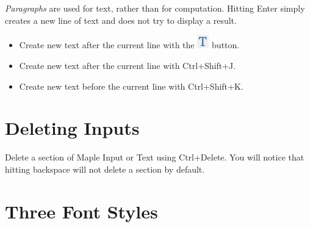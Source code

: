 \textit{Paragraphs} are used for text, rather than for computation. Hitting Enter simply creates a new line of text and does not try to display a result.
\begin{itemize}
\item Create new text after the current line with the \includegraphics[width=0.04\textwidth]{tutorials/figures/new_text.PNG} button.
\item Create new text after the current line with Ctrl+Shift+J.
\item Create new text before the current line with Ctrl+Shift+K.
\end{itemize}

\section{Deleting Inputs}
\label{sec:deleting_intputs}

Delete a section of Maple Input or Text using Ctrl+Delete. You will notice that hitting backspace will not delete a section by default.

\section{Three Font Styles}
\label{sec:three_font_styles}

